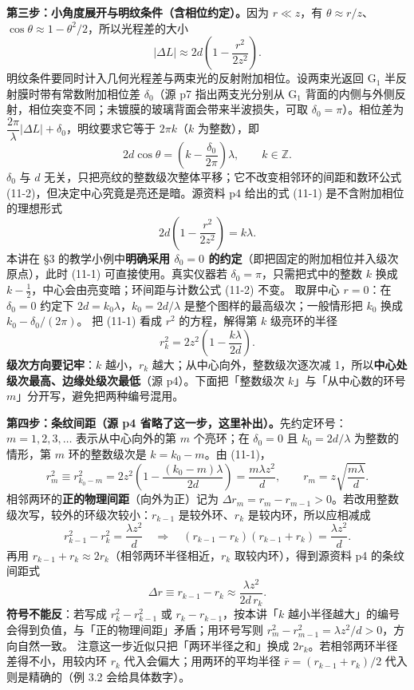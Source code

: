 \documentclass[11pt]{ctexart}
\newcommand{\Dl}{d}
\begin{document}
\textbf{第三步：小角度展开与明纹条件（含相位约定）。}因为 $r\ll z$，有 $\theta\approx r/z$、$\cos\theta\approx1-\theta^2/2$，所以光程差的大小
\[
  |\Delta L|\approx 2\Dl\left(1-\frac{r^2}{2z^2}\right).
\]
明纹条件要同时计入几何光程差与两束光的反射附加相位。设两束光返回 G$_1$ 半反射膜时带有常数附加相位差 $\delta_0$（源 p7 指出两支光分别从 G$_1$ 背面的内侧与外侧反射，相位突变不同；未镀膜的玻璃背面会带来半波损失，可取 $\delta_0=\pi$）。相位差为 $\dfrac{2\pi}{\lambda}|\Delta L|+\delta_0$，明纹要求它等于 $2\pi k$（$k$ 为整数），即
\begin{equation}
  2\Dl\cos\theta=\left(k-\frac{\delta_0}{2\pi}\right)\lambda,\qquad k\in\mathbb Z .
  \tag{11-1$'$}
\end{equation}
$\delta_0$ 与 $\Dl$ 无关，只把亮纹的整数级次整体平移；它不改变相邻环的间距和数环公式 (11-2)，但决定中心究竟是亮还是暗。源资料 p4 给出的式 (11-1) 是不含附加相位的理想形式
\begin{equation}
  2\Dl\left(1-\frac{r^2}{2z^2}\right)=k\lambda .
  \tag{11-1}
\end{equation}
本讲在 §3 的教学小例中\textbf{明确采用 $\delta_0=0$ 的约定}（即把固定的附加相位并入级次原点），此时 (11-1) 可直接使用。真实仪器若 $\delta_0=\pi$，只需把式中的整数 $k$ 换成 $k-\tfrac12$，中心会由亮变暗；环间距与计数公式 (11-2) 不变。
取屏中心 $r=0$：在 $\delta_0=0$ 约定下 $2\Dl=k_0\lambda$，$k_0=2\Dl/\lambda$ 是整个图样的最高级次；一般情形把 $k_0$ 换成 $k_0-\delta_0/(2\pi)$。
把 (11-1) 看成 $r^2$ 的方程，解得第 $k$ 级亮环的半径
\begin{equation}
  r_k^2=2z^2\left(1-\frac{k\lambda}{2\Dl}\right).
  \label{eq:rk}
\end{equation}
\textbf{级次方向要记牢}：$k$ 越小，$r_k$ 越大；从中心向外，整数级次逐次减 1，所以\textbf{中心处级次最高、边缘处级次最低}（源 p4）。下面把「整数级次 $k$」与「从中心数的环号 $m$」分开写，避免把两种编号混用。

\textbf{第四步：条纹间距（源 p4 省略了这一步，这里补出）。}先约定环号：$m=1,2,3,\dots$ 表示从中心向外的第 $m$ 个亮环；在 $\delta_0=0$ 且 $k_0=2\Dl/\lambda$ 为整数的情形，第 $m$ 环的整数级次是 $k=k_0-m$。由 (11-1)，
\[
  r_m^2\equiv r_{k_0-m}^2
  =2z^2\left(1-\frac{(k_0-m)\lambda}{2\Dl}\right)
  =\frac{m\lambda z^2}{\Dl},
  \qquad
  r_m=z\sqrt{\frac{m\lambda}{\Dl}} .
\]
相邻两环的\textbf{正的物理间距}（向外为正）记为 $\Delta r_m=r_m-r_{m-1}>0$。若改用整数级次写，较外的环级次较小：$r_{k-1}$ 是较外环、$r_k$ 是较内环，所以应相减成
\[
  r_{k-1}^2-r_k^2=\frac{\lambda z^2}{\Dl}
  \quad\Longrightarrow\quad
  (r_{k-1}-r_k)(r_{k-1}+r_k)=\frac{\lambda z^2}{\Dl}.
\]
再用 $r_{k-1}+r_k\approx2r_k$（相邻两环半径相近，$r_k$ 取较内环），得到源资料 p4 的条纹间距式
\begin{equation}
  \Delta r\equiv r_{k-1}-r_k\approx\frac{\lambda z^2}{2\Dl\,r_k}.
  \tag{补}
\end{equation}
\textbf{符号不能反}：若写成 $r_k^2-r_{k-1}^2$ 或 $r_k-r_{k-1}$，按本讲「$k$ 越小半径越大」的编号会得到负值，与「正的物理间距」矛盾；用环号写则 $r_m^2-r_{m-1}^2=\lambda z^2/\Dl>0$，方向自然一致。
注意这一步近似只把「两环半径之和」换成 $2r_k$。若相邻两环半径差得不小，用较内环 $r_k$ 代入会偏大；用两环的平均半径 $\bar r=(r_{k-1}+r_k)/2$ 代入则是精确的（例 3.2 会给具体数字）。
\end{document}
